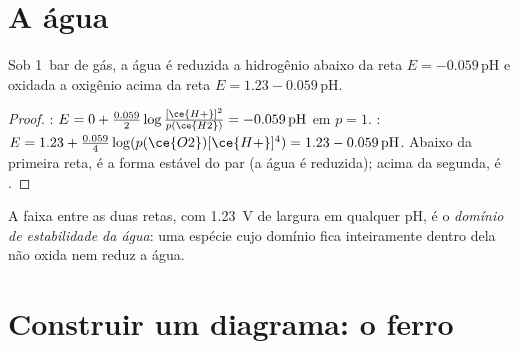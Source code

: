 \section{A água}

\begin{proposition}\label{prop:b1:e-ph-diagrams:water-lines}
Sob \qty{1}{bar} de gás, a água é reduzida a hidrogênio abaixo da reta
$E = -0.059\,\mathrm{pH}$ e oxidada a oxigênio acima da reta $E = 1.23
- 0.059\,\mathrm{pH}$.
\end{proposition}

\begin{proof}
: $E = 0 + \frac{0.059}{2}\log\frac{[\ce{H+}]^2}{p(\ce{H2})}
= -0.059\,\mathrm{pH}$ em $p = 1$. : $E = 1.23 +
\frac{0.059}{4}\log(p(\ce{O2})[\ce{H+}]^4) = 1.23 - 0.059\,\mathrm{pH}$.
Abaixo da primeira reta,  é a forma estável do par (a água é
reduzida); acima da segunda, é .
\end{proof}

\begin{definition}\label{def:b1:e-ph-diagrams:water-domain}
A faixa entre as duas retas, com \qty{1.23}{V} de largura em qualquer pH,
é o \emph{domínio de estabilidade da água}:
uma espécie cujo domínio fica inteiramente dentro dela não oxida nem
reduz a água.
\end{definition}

\section{Construir um diagrama: o ferro}

